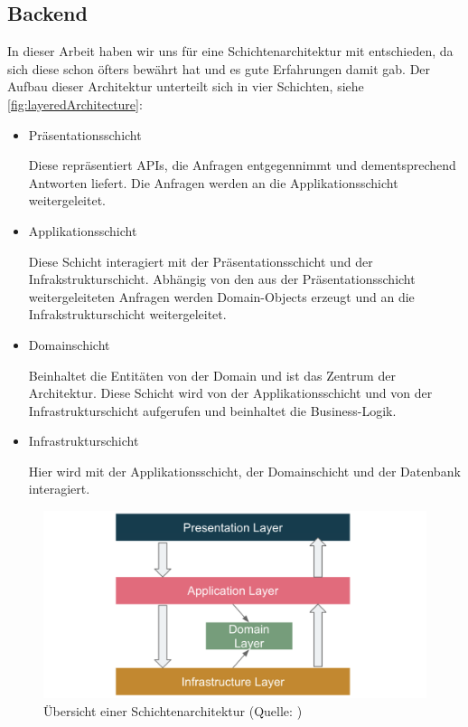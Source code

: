 \documentclass[a4paper, fontsize=11pt, parskip=half, twoside]{scrreprt}
\begin{document}
	\subsection{Backend} \label{subsec:backend}
	In dieser Arbeit haben wir uns für eine Schichtenarchitektur mit  entschieden, da sich diese schon öfters bewährt hat und es gute Erfahrungen damit gab.
	Der Aufbau dieser Architektur unterteilt sich in vier Schichten, siehe \autoref{fig:layeredArchitecture}:
	
	\begin{itemize}
		\item Präsentationsschicht
		
		Diese repräsentiert \ac{API}s, die Anfragen entgegennimmt und dementsprechend Antworten liefert.
		Die Anfragen werden an die Applikationsschicht weitergeleitet.
		
		\item Applikationsschicht
		
		Diese Schicht interagiert mit der Präsentationsschicht und der Infrakstrukturschicht.
		Abhängig von den aus der Präsentationsschicht weitergeleiteten Anfragen werden Domain-Objects erzeugt und an die Infrakstrukturschicht weitergeleitet.
		
		\item Domainschicht
		
		Beinhaltet die Entitäten von der Domain und ist das Zentrum der Architektur.
		Diese Schicht wird von der Applikationsschicht und von der Infrastrukturschicht aufgerufen und beinhaltet die Business-Logik.
		
		\item Infrastrukturschicht
		
		Hier wird mit der Applikationsschicht, der Domainschicht und der Datenbank interagiert.
	\end{itemize}

	\begin{figure}[ht]
		\centering
		\includegraphics[scale=0.5]{assets/layeredArchitecture.png}
		\caption{Übersicht einer Schichtenarchitektur (Quelle: \textcite{zhang_domain_nodate})}
		\label{fig:layeredArchitecture}
	\end{figure}
	
\end{document}
